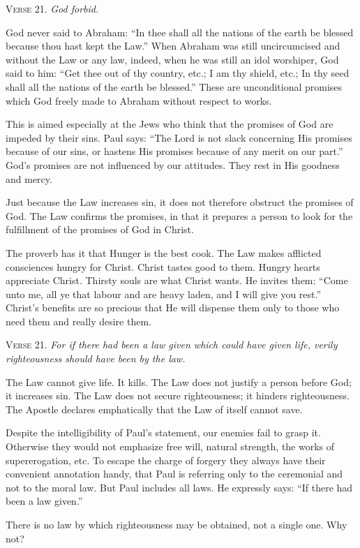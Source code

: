 \textsc{Verse} 21. \emph{God forbid.}

God never said to Abraham: “In thee shall all the nations of the earth be blessed because thou hast kept the Law.” When Abraham was still uncircumcised and without the Law or any law, indeed, when he was still an idol worshiper, God said to him: “Get thee out of thy country, etc.; I am thy shield, etc.; In thy seed shall all the nations of the earth be blessed.” These are unconditional promises which God freely made to Abraham without respect to works.

This is aimed especially at the Jews who think that the promises of God are impeded by their sins. Paul says: “The Lord is not slack concerning His promises because of our sins, or hastens His promises because of any merit on our part.” God’s promises are not influenced by our attitudes. They rest in His goodness and mercy.

Just because the Law increases sin, it does not therefore obstruct the promises of God. The Law confirms the promises, in that it prepares a person to look for the fulfillment of the promises of God in Christ.

The proverb has it that Hunger is the best cook. The Law makes afflicted consciences hungry for Christ. Christ tastes good to them. Hungry hearts appreciate Christ. Thirsty souls are what Christ wants. He invites them: “Come unto me, all ye that labour and are heavy laden, and I will give you rest.” Christ’s benefits are so precious that He will dispense them only to those who need them and really desire them.

\textsc{Verse} 21. \emph{For if there had been a law given which could have given life, verily righteousness should have been by the law.}

The Law cannot give life. It kills. The Law does not justify a person before God; it increases sin. The Law does not secure righteousness; it hinders righteousness. The Apostle declares emphatically that the Law of itself cannot save.

Despite the intelligibility of Paul’s statement, our enemies fail to grasp it. Otherwise they would not emphasize free will, natural strength, the works of supererogation, etc. To escape the charge of forgery they always have their convenient annotation handy, that Paul is referring only to the ceremonial and not to the moral law. But Paul includes all laws. He expressly says: “If there had been a law given.”

There is no law by which righteousness may be obtained, not a single one. Why not?

